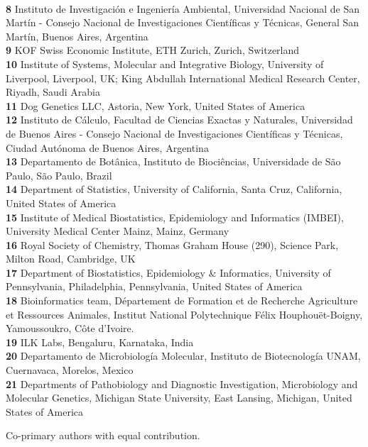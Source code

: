 \documentclass[10pt,letterpaper]{article}
\begin{document}
\begin{flushleft}
\\
\textbf{8} Instituto de Investigación e Ingeniería Ambiental, Universidad Nacional de San Martín - Consejo Nacional de Investigaciones Científicas y Técnicas, General San Martín, Buenos Aires, Argentina
\\
\textbf{9} KOF Swiss Economic Institute, ETH Zurich, Zurich, Switzerland
\\
\textbf{10} Institute of Systems, Molecular and Integrative Biology, University of Liverpool, Liverpool, UK; King Abdullah International Medical Research Center, Riyadh, Saudi Arabia
\\
\textbf{11} Dog Genetics LLC, Astoria, New York, United States of America
\\
\textbf{12} Instituto de Cálculo, Facultad de Ciencias Exactas y Naturales, Universidad de Buenos Aires - Consejo Nacional de Investigaciones Científicas y Técnicas, Ciudad Autónoma de Buenos Aires, Argentina
\\
\textbf{13} Departamento de Botânica, Instituto de Biociências, Universidade de São Paulo, São Paulo, Brazil
\\
\textbf{14} Department of Statistics, University of California, Santa Cruz, California, United States of America
\\
\textbf{15} Institute of Medical Biostatistics, Epidemiology and Informatics (IMBEI), University Medical Center Mainz, Mainz, Germany
\\
\textbf{16} Royal Society of Chemistry, Thomas Graham House (290), Science Park, Milton Road, Cambridge, UK
\\
\textbf{17} Department of Biostatistics, Epidemiology \& Informatics, University of Pennsylvania, Philadelphia, Pennsylvania, United States of America
\\
\textbf{18} Bioinformatics team, Département de Formation et de Recherche Agriculture et Ressources Animales, Institut National Polytechnique Félix Houphouët-Boigny, Yamoussoukro, Côte d’Ivoire.
\\
\textbf{19} ILK Labs, Bengaluru, Karnataka, India
\\
\textbf{20} Departamento de Microbiología Molecular, Instituto de Biotecnología UNAM, Cuernavaca, Morelos, Mexico
\\
\textbf{21} Departments of Pathobiology and Diagnostic Investigation, Microbiology and Molecular Genetics, Michigan State University, East Lansing, Michigan, United States of America
\\
\bigskip

% 
%
\Yinyang Co-primary authors with equal contribution.


\end{flushleft}
\end{document}
